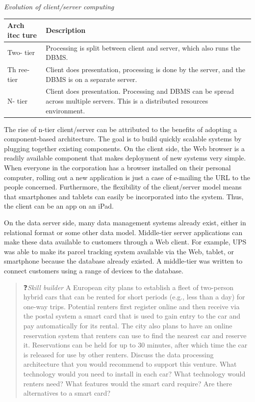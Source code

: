 \documentclass[
]{article}
\begin{document}
\emph{Evolution of client/server computing}

\begin{longtable}[]{@{}
  >{\raggedright\arraybackslash}p{}
  >{\raggedright\arraybackslash}p{}@{}}
\toprule
Arch itec
ture & Description \\
\midrule
\endhead
Two- tier & Processing is split between client and server, which
also runs the DBMS. \\
Th ree-
tier & Client does presentation, processing is done by the
server, and the DBMS is on a separate server. \\
N- tier & Client does presentation. Processing and DBMS can be
spread across multiple servers. This is a distributed
resources environment. \\
\bottomrule
\end{longtable}

The rise of n-tier client/server can be attributed to the benefits of
adopting a component-based architecture. The goal is to build quickly
scalable systems by plugging together existing components. On the client
side, the Web browser is a readily available component that makes
deployment of new systems very simple. When everyone in the corporation
has a browser installed on their personal computer, rolling out a new
application is just a case of e-mailing the URL to the people concerned.
Furthermore, the flexibility of the client/server model means that
smartphones and tablets can easily be incorporated into the system.
Thus, the client can be an app on an iPad.

On the data server side, many data management systems already exist,
either in relational format or some other data model. Middle-tier server
applications can make these data available to customers through a Web
client. For example, UPS was able to make its parcel tracking system
available via the Web, tablet, or smartphone because the database
already existed. A middle-tier was written to connect customers using a
range of devices to the database.

\begin{quote}
❓\emph{Skill builder} A European city plans to establish a fleet of
two-person hybrid cars that can be rented for short periods (e.g.,
less than a day) for one-way trips. Potential renters first register
online and then receive via the postal system a smart card that is
used to gain entry to the car and pay automatically for its rental.
The city also plans to have an online reservation system that renters
can use to find the nearest car and reserve it. Reservations can be
held for up to 30 minutes, after which time the car is released for
use by other renters. Discuss the data processing architecture that
you would recommend to support this venture. What technology would you
need to install in each car? What technology would renters need? What
features would the smart card require? Are there alternatives to a
smart card?
\end{quote}
\end{document}
